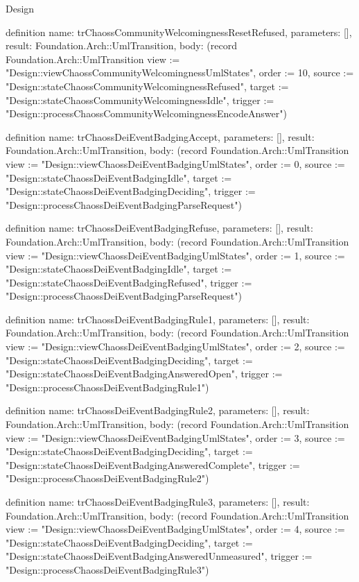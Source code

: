 \begin{lexlean}{Design}
\begin{semanticmodule}
definition{
  name: trChaossCommunityWelcomingnessResetRefused,
  parameters: [],
  result: Foundation.Arch::UmlTransition,
  body: (record Foundation.Arch::UmlTransition {view := "Design::viewChaossCommunityWelcomingnessUmlStates", order := 10, source := "Design::stateChaossCommunityWelcomingnessRefused", target := "Design::stateChaossCommunityWelcomingnessIdle", trigger := "Design::processChaossCommunityWelcomingnessEncodeAnswer"})
}

definition{
  name: trChaossDeiEventBadgingAccept,
  parameters: [],
  result: Foundation.Arch::UmlTransition,
  body: (record Foundation.Arch::UmlTransition {view := "Design::viewChaossDeiEventBadgingUmlStates", order := 0, source := "Design::stateChaossDeiEventBadgingIdle", target := "Design::stateChaossDeiEventBadgingDeciding", trigger := "Design::processChaossDeiEventBadgingParseRequest"})
}

definition{
  name: trChaossDeiEventBadgingRefuse,
  parameters: [],
  result: Foundation.Arch::UmlTransition,
  body: (record Foundation.Arch::UmlTransition {view := "Design::viewChaossDeiEventBadgingUmlStates", order := 1, source := "Design::stateChaossDeiEventBadgingIdle", target := "Design::stateChaossDeiEventBadgingRefused", trigger := "Design::processChaossDeiEventBadgingParseRequest"})
}

definition{
  name: trChaossDeiEventBadgingRule1,
  parameters: [],
  result: Foundation.Arch::UmlTransition,
  body: (record Foundation.Arch::UmlTransition {view := "Design::viewChaossDeiEventBadgingUmlStates", order := 2, source := "Design::stateChaossDeiEventBadgingDeciding", target := "Design::stateChaossDeiEventBadgingAnsweredOpen", trigger := "Design::processChaossDeiEventBadgingRule1"})
}

definition{
  name: trChaossDeiEventBadgingRule2,
  parameters: [],
  result: Foundation.Arch::UmlTransition,
  body: (record Foundation.Arch::UmlTransition {view := "Design::viewChaossDeiEventBadgingUmlStates", order := 3, source := "Design::stateChaossDeiEventBadgingDeciding", target := "Design::stateChaossDeiEventBadgingAnsweredComplete", trigger := "Design::processChaossDeiEventBadgingRule2"})
}

definition{
  name: trChaossDeiEventBadgingRule3,
  parameters: [],
  result: Foundation.Arch::UmlTransition,
  body: (record Foundation.Arch::UmlTransition {view := "Design::viewChaossDeiEventBadgingUmlStates", order := 4, source := "Design::stateChaossDeiEventBadgingDeciding", target := "Design::stateChaossDeiEventBadgingAnsweredUnmeasured", trigger := "Design::processChaossDeiEventBadgingRule3"})
}


\end{semanticmodule}
\end{lexlean}
